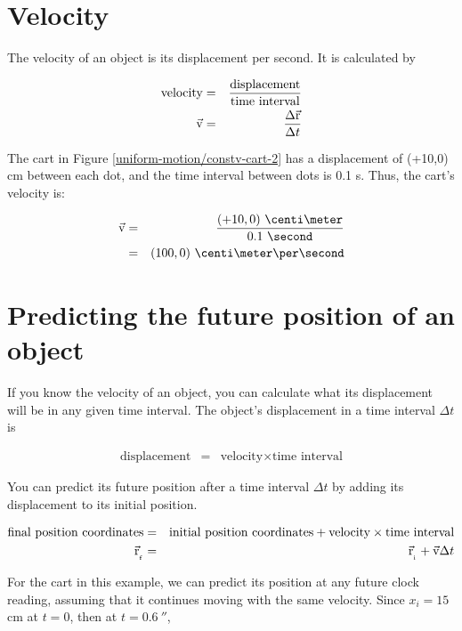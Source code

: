 \pagebreak

\section*{Velocity}

The velocity of an object is its displacement per second. It is calculated by

\begin{eqnarray*}
	\mbox{velocity} & = & \frac{\mbox{displacement}}{\mbox{time interval}} \\
	\vec{\mathrm{v}} & = & \frac{\Delta \vec{\mathrm{r}} }{\Delta t}
\end{eqnarray*}

The cart in Figure \ref{uniform-motion/constv-cart-2} has a displacement of (+10,0) cm between each dot, and the time interval between dots is 0.1 s. Thus, the cart's velocity is:

\begin{eqnarray*}
	\vect{v} & = & \frac{(+10,0)\ \centi\meter}{0.1\ \second} \\
	& = & (100,0)\ \centi\meter \per \second
\end{eqnarray*}

\section*{Predicting the future position of an object}

If you know the velocity of an object, you can calculate what its displacement will be in any given time interval. The object's displacement in a time interval $\Delta t$ is

\begin{eqnarray*}
	\mbox{displacement} & = & \mbox{velocity} \times \mbox{time interval}
\end{eqnarray*}

You can predict its future position after a time interval $\Delta t$ by adding its displacement to its initial position.

\begin{eqnarray*}
	\mbox{final position coordinates} & = &  \mbox{initial position coordinates} + \mbox{velocity} \times \mbox{time interval} \\
	\vec{\mathrm{r}}_{_{_{\mbox{\tiny{f}}}}} & = & \vec{\mathrm{r}}_{_{_{\mbox{\tiny{i}}}}} + \vec{\mathrm{v}}\Delta t
\end{eqnarray*}

For the cart in this example, we can predict its position at any future clock reading, assuming that it continues moving with the same velocity. Since $x_i=15$ cm at $t=0$, then at $t=0.6\ \second$, 


